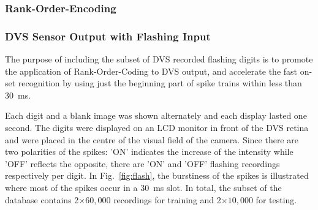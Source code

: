 	
	\subsubsection{Rank-Order-Encoding}
  
	\subsubsection{DVS Sensor Output with Flashing Input}
	\label{subsec_flash}
	The purpose of including the subset of DVS recorded flashing digits is to promote the application of Rank-Order-Coding to DVS output, and accelerate the fast on-set recognition by using just the beginning part of spike trains within less than 30~ms.
	
	Each digit and a blank image was shown alternately and each display lasted one second.
	The digits were displayed on an LCD monitor in front of the DVS retina~\citep{serrano2013128} and were placed in the centre of the visual field of the camera.
	Since there are two polarities of the spikes: 'ON' indicates the increase of the intensity while 'OFF' reflects the opposite, there are 'ON' and 'OFF' flashing recordings respectively per digit.
	In Fig.~\ref{fig:flash}, the burstiness of the spikes is illustrated where most of the spikes occur in a 30~ms slot. 
	In total, the subset of the database contains 2$\times$$60,000$ recordings for training and 2$\times$$10,000$ for testing.

	\begin{figure*}[b!]
	  \centering
	  	  \\

	  \caption{DVS sensor with flashing input.
	  	Blue is used for `ON' events and green for `OFF' events.
	  	(a) The raster plot.
	  	(b) The bursty nature of the resulting spikes is illustrated, where most of the spikes occur in a 30~ms time slot.}
	  \label{fig:flash}
	\end{figure*}
